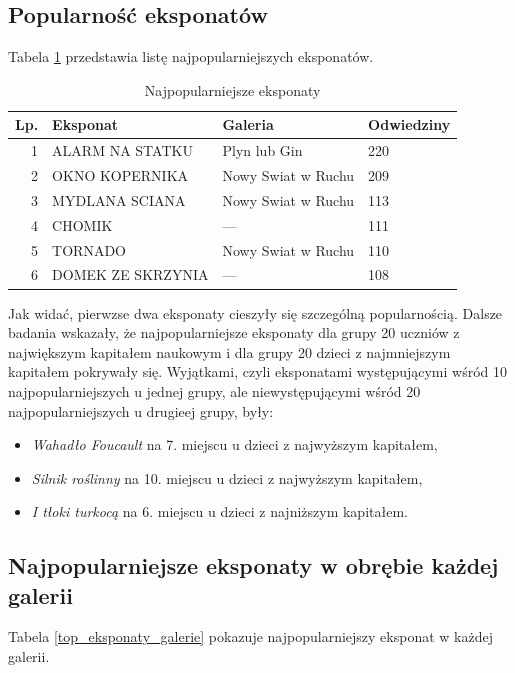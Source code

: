 \documentclass[conference]{IEEEtran}
\begin{document}
\subsection{Popularność eksponatów}
Tabela \ref{top_eksponaty} przedstawia listę najpopularniejszych eksponatów.
\begin{table}[H]
\caption{Najpopularniejsze eksponaty}
\label{top_eksponaty}
\centering
\begin{tabular}{|r|l|l|l|}
\hline
\textbf{Lp.} & \textbf{Eksponat} & \textbf{Galeria} & \textbf{Odwiedziny} \\
\hline
 1 &   ALARM NA STATKU  &     Plyn lub Gin     &         220 \\
 2 &   OKNO KOPERNIKA & Nowy Swiat w Ruchu    &          209 \\
 3 &   MYDLANA SCIANA & Nowy Swiat w Ruchu   &           113 \\
 4 &           CHOMIK  &           ---    &          111 \\
 5 &          TORNADO & Nowy Swiat w Ruchu    &          110 \\
 6 & DOMEK ZE SKRZYNIA  &           ---   &          108 \\
\hline
\end{tabular}
\end{table}
Jak widać, pierwzse dwa eksponaty cieszyły się szczególną popularnością. Dalsze badania wskazały, że najpopularniejsze eksponaty dla grupy 20 uczniów z największym kapitałem naukowym i dla grupy 20 dzieci z najmniejszym kapitałem pokrywały się. Wyjątkami, czyli eksponatami występującymi wśród 10 najpopularniejszych u jednej grupy, ale niewystępującymi wśród 20 najpopularniejszych u drugieej grupy, były:
\begin{itemize}
\item \textit{Wahadło Foucault} na 7. miejscu u dzieci z najwyższym kapitałem,
\item \textit{Silnik roślinny} na 10. miejscu u dzieci z najwyższym kapitałem,
\item \textit{I tłoki turkocą} na 6. miejscu u dzieci z najniższym kapitałem.
\end{itemize}
\subsection{Najpopularniejsze eksponaty w obrębie każdej galerii}
Tabela \ref{top_eksponaty_galerie} pokazuje najpopularniejszy eksponat w każdej galerii.
\end{document}
